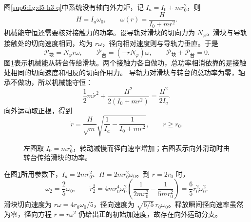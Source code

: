 \begin{solution}
图\ref{sup6:fig:d5-h3-q}中系统没有轴向外力矩，记 $I_a=I_0+mr_0^2$，则
\[
H=I_a\omega_0,
\qquad \omega(r)=\frac H{I_0+mr^2}.
\]
机械能守恒还需要核对接触力的功率。设导轨对滑块的切向力为 $N_\varphi$。滑块与导轨接触处的切向速度相同，均为 $r\omega$，径向相对速度则与导轨力垂直。于是
\[
\mathcal P_{\text{块}}=N_\varphi r\omega,\qquad
\mathcal P_{\text{台}}=(-rN_\varphi)\omega,
\qquad \mathcal P_{\text{块}}+\mathcal P_{\text{台}}=0.
\]
图\ref{sup6:fig:d5-h3-s}表示机械能从转台传给滑块。两个接触力各自做功，总功率相消依靠的是接触处相同的切向速度和相反的切向作用力。
导轨力对滑块与转台的总功率为零，轴承不做功，所以机械能守恒：
\[
\frac12m\dot r^2+\frac{H^2}{2(I_0+mr^2)}=\frac{H^2}{2I_a}.
\]
向外运动取正根，得到
\[
\dot r=\frac H{\sqrt m}\sqrt{\frac1{I_a}-\frac1{I_0+mr^2}},\qquad r\ge r_0.
\]
\begin{figure}[H]\centering
{}
\caption{左图取 $I_0=mr_0^2$，转动减慢而径向速率增加；右图表示向外滑动时由转台传给滑块的功率。}\label{sup6:fig:d5-h3-s}
\end{figure}
在图\ref{sup6:fig:d5-h3-s}所用参数下，$I_a=2mr_0^2$、$H=2mr_0^2\omega_0$。到 $r=2r_0$ 时，
\[
\omega_2=\frac25\omega_0,
\qquad \dot r_2^2=4mr_0^4\omega_0^2
\left(\frac1{2mr_0^2}-\frac1{5mr_0^2}\right)
=\frac65r_0^2\omega_0^2.
\]
滑块切向速度为 $r\omega=4r_0\omega_0/5$，径向速度为 $\sqrt{6/5}\,r_0\omega_0$。释放瞬间径向速率虽然为零，径向方程 $\ddot r=r\omega^2$ 仍给出正的初始加速度，故存在向外运动分支。
\end{solution}


